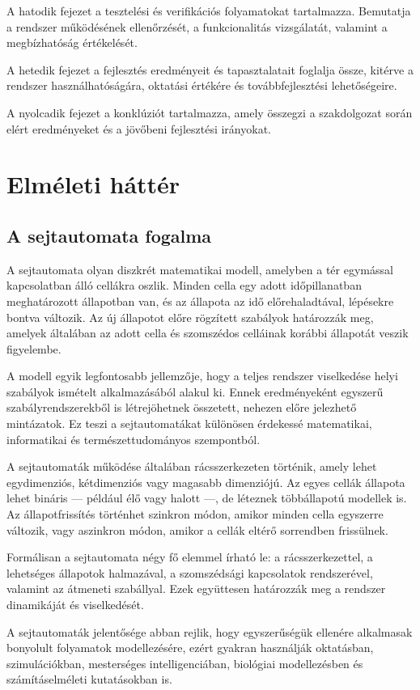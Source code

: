 \documentclass{thesis-ekf}
\begin{document}
A hatodik fejezet a tesztelési és verifikációs folyamatokat tartalmazza. Bemutatja a rendszer működésének ellenőrzését, a funkcionalitás vizsgálatát, valamint a megbízhatóság értékelését.

A hetedik fejezet a fejlesztés eredményeit és tapasztalatait foglalja össze, kitérve a rendszer használhatóságára, oktatási értékére és továbbfejlesztési lehetőségeire.

A nyolcadik fejezet a konklúziót tartalmazza, amely összegzi a szakdolgozat során elért eredményeket és a jövőbeni fejlesztési irányokat.

\chapter{Elméleti háttér}

\section{A sejtautomata fogalma}
A sejtautomata olyan diszkrét matematikai modell, amelyben a tér egymással kapcsolatban álló cellákra oszlik. Minden cella egy adott időpillanatban meghatározott állapotban van, és az állapota az idő előrehaladtával, lépésekre bontva változik. Az új állapotot előre rögzített szabályok határozzák meg, amelyek általában az adott cella és szomszédos celláinak korábbi állapotát veszik figyelembe.

A modell egyik legfontosabb jellemzője, hogy a teljes rendszer viselkedése helyi szabályok ismételt alkalmazásából alakul ki. Ennek eredményeként egyszerű szabályrendszerekből is létrejöhetnek összetett, nehezen előre jelezhető mintázatok. Ez teszi a sejtautomatákat különösen érdekessé matematikai, informatikai és természettudományos szempontból.

A sejtautomaták működése általában rácsszerkezeten történik, amely lehet egydimenziós, kétdimenziós vagy magasabb dimenziójú. Az egyes cellák állapota lehet bináris --- például élő vagy halott ---, de léteznek többállapotú modellek is. Az állapotfrissítés történhet szinkron módon, amikor minden cella egyszerre változik, vagy aszinkron módon, amikor a cellák eltérő sorrendben frissülnek.

Formálisan a sejtautomata négy fő elemmel írható le: a rácsszerkezettel, a lehetséges állapotok halmazával, a szomszédsági kapcsolatok rendszerével, valamint az átmeneti szabállyal. Ezek együttesen határozzák meg a rendszer dinamikáját és viselkedését.

A sejtautomaták jelentősége abban rejlik, hogy egyszerűségük ellenére alkalmasak bonyolult folyamatok modellezésére, ezért gyakran használják oktatásban, szimulációkban, mesterséges intelligenciában, biológiai modellezésben és számításelméleti kutatásokban is.
\end{document}
